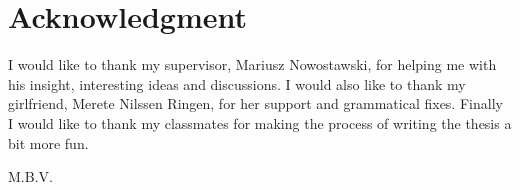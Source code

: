 \chapter*{Acknowledgment}
I would like to thank my supervisor, Mariusz Nowostawski, for helping me with his insight, interesting ideas and discussions.
I would also like to thank my girlfriend, Merete Nilssen Ringen, for her support and grammatical fixes.
Finally I would like to thank my classmates for making the process of writing the thesis a bit more fun.

%
%

\begin{flushright}
M.B.V.\\[1pc]
\end{flushright}
